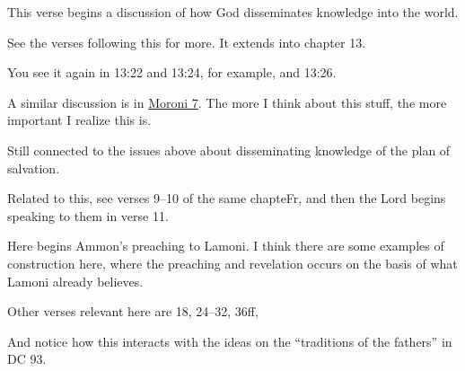 \begin{compactdesc}
				\begin{compactitem}
					\item This verse begins a discussion of how God disseminates knowledge into the world.
					\item See the verses following this for more. It extends into chapter 13.
						\begin{compactitem}
							\item You see it again in 13:22 and 13:24, for example, and 13:26.
						\end{compactitem}
					\item A similar discussion is in \hyperref[MORONI-7]{Moroni 7}. The more I think about this stuff, the more important I realize this is.
				\end{compactitem}
			\item[{\hyperref[ALMA-12-30]{Alma 12:30}}]
			\item[{\hyperref[ALMA-13-3]{Alma 13:3--10}}] \phantom{.}	
				\begin{compactitem}
					\item Still connected to the issues above about disseminating knowledge of the plan of salvation.
				\end{compactitem}
			\item[{\hyperref[ALMA-13-28]{Alma 13:28}}]
			\item[{\hyperref[ALMA-14-10]{Alma 14:10--11}}]
			\item[{\hyperref[ALMA-16-4]{Alma 16:4--6}}]
			\item[{\hyperref[ALMA-16-15]{Alma 16:15--17}}]
			\item[{\hyperref[ALMA-17-2]{Alma 17:2--4}}] \phantom{.}
				\begin{compactitem}
					\item Related to this, see verses 9--10 of the same chapteFr, and then the Lord begins speaking to them in verse 11.
				\end{compactitem}
			\item[{\hyperref[ALMA-18-2]{Alma 18:2}}] \phantom{.}
				\begin{compactitem}
					\item Here begins Ammon's preaching to Lamoni. I think there are some examples of construction here, where the preaching and revelation occurs on the basis of what Lamoni already believes.
					\item Other verses relevant here are 18, 24--32, 36ff, 
					\item And notice how this interacts with the ideas on the ``traditions of the fathers'' in DC 93.

\end{compactitem}
\end{compactdesc}
